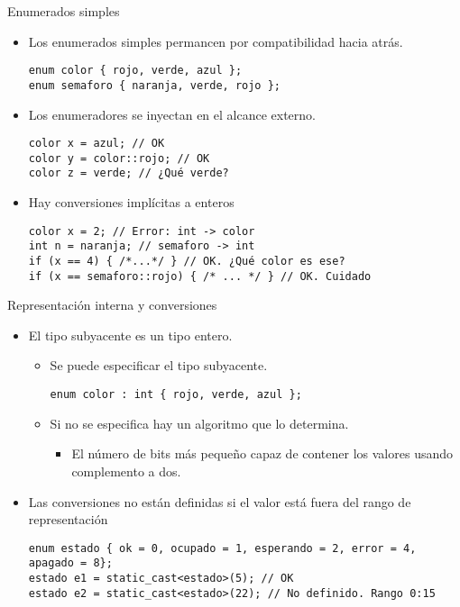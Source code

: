 \begin{frame}[fragile]{Enumerados simples}
\begin{itemize}
  \item Los enumerados simples permancen por compatibilidad hacia atrás.
\begin{lstlisting}
enum color { rojo, verde, azul };
enum semaforo { naranja, verde, rojo };
\end{lstlisting}
  \item Los enumeradores se inyectan en el alcance externo.
\begin{lstlisting}
color x = azul; // OK
color y = color::rojo; // OK
color z = verde; // ¿Qué verde?
\end{lstlisting}
  \item Hay conversiones implícitas a enteros
\begin{lstlisting}
color x = 2; // Error: int -> color
int n = naranja; // semaforo -> int
if (x == 4) { /*...*/ } // OK. ¿Qué color es ese?
if (x == semaforo::rojo) { /* ... */ } // OK. Cuidado
\end{lstlisting}
\end{itemize}
\end{frame}

\begin{frame}[fragile]{Representación interna y conversiones}
\begin{itemize}
  \item El tipo subyacente es un tipo entero.
    \begin{itemize}
      \item Se puede especificar el tipo subyacente.
\begin{lstlisting}
enum color : int { rojo, verde, azul };
\end{lstlisting}
      \item Si no se especifica hay un algoritmo que lo determina.
        \begin{itemize}
          \item El número de bits más pequeño capaz de contener los valores usando
                complemento a dos.
        \end{itemize}
    \end{itemize}
  \item Las conversiones no están definidas si el valor está fuera del rango de representación
\begin{lstlisting}
enum estado { ok = 0, ocupado = 1, esperando = 2, error = 4, apagado = 8};
estado e1 = static_cast<estado>(5); // OK
estado e2 = static_cast<estado>(22); // No definido. Rango 0:15
\end{lstlisting}
\end{itemize}
\end{frame}

